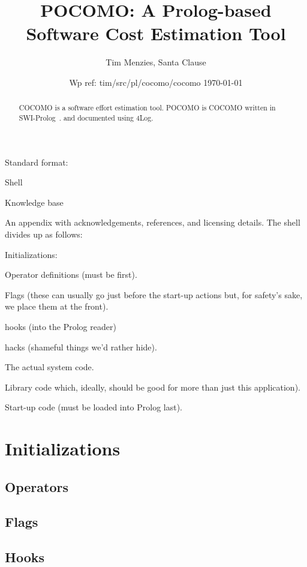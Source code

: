 \documentclass[twocolumn,global]{svjour}
\date{Wp ref: tim/src/pl/cocomo/cocomo \today}
\newcommand{\ME}{POCOMO}
\begin{document}
\title{\ME: A Prolog-based Software Cost Estimation Tool}
\author{Tim Menzies, Santa Clause}
\institute{}
\maketitle
\thispagestyle{empty}\pagestyle{plain}
 \begin{abstract}
COCOMO is a software effort estimation tool.
POCOMO is COCOMO written in SWI-Prolog~\cite{swiprolog}. and documented using
{\Tex4Log}.
\end{abstract} 
\setcounter{tocdepth}{4}\tableofcontents\listoffigures
\section{%
}
 Standard format:
\bi
\item
Shell
\item Knowledge base
\item 
An appendix with acknowledgements, references, and licensing details.
\ei
The shell divides up as follows:
\bi
\item Initializations:
\bi
\item
Operator definitions (must be first).
\item
Flags (these can usually go just before the start-up
actions but, for safety's sake, we place them at the
front).
\item
hooks (into the Prolog reader)
\item
hacks (shameful things we'd rather hide).
\ei
\item
The actual system code.
\item
Library code which, ideally,
should be good for more than just this application).
\item
Start-up code (must be loaded into Prolog last).
\ei 
\section{ Initializations
}
\subsection{ Operators
}
\subsection{ Flags
}
\subsection{ Hooks
}
\end{document}
